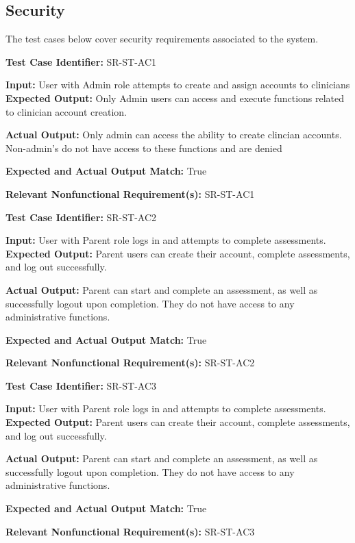 \documentclass[12pt, titlepage]{article}
\begin{document}
\newpage{}

\subsection{Security}
\hspace{2em}The test cases below cover security requirements associated to the system. 

\begin{mdframed}[linewidth=0.5mm] \par
  \textbf{Test Case Identifier:} SR-ST-AC1 \par
  \textbf{Input:} User with Admin role attempts to create and assign accounts
  to clinicians  
  \textbf{Expected Output:} Only Admin users can access and execute functions related to
  clinician account creation. \par
  \textbf{Actual Output:} Only admin can access the ability to create clincian accounts. Non-admin's do not have access to these functions
  and are denied \par
  \textbf{Expected and Actual Output Match:} True \par
  \textbf{Relevant Nonfunctional Requirement(s):} SR-ST-AC1
\end{mdframed}

\begin{mdframed}[linewidth=0.5mm] \par
  \textbf{Test Case Identifier:} SR-ST-AC2 \par
  \textbf{Input:} User with Parent role logs in and attempts to complete
  assessments.
  \textbf{Expected Output:} Parent users can create their account, complete assessments,
  and log out successfully. \par
  \textbf{Actual Output:} Parent can start and complete an assessment, as well as successfully logout upon completion. They do not have access to any administrative functions. \par
  \textbf{Expected and Actual Output Match:} True \par
  \textbf{Relevant Nonfunctional Requirement(s):} SR-ST-AC2
\end{mdframed}

\begin{mdframed}[linewidth=0.5mm] \par
  \textbf{Test Case Identifier:} SR-ST-AC3 \par
  \textbf{Input:} User with Parent role logs in and attempts to complete
  assessments.
  \textbf{Expected Output:} Parent users can create their account, complete assessments,
  and log out successfully. \par
  \textbf{Actual Output:} Parent can start and complete an assessment, as well as successfully logout upon completion. They do not have access to any administrative functions. \par
  \textbf{Expected and Actual Output Match:} True \par
  \textbf{Relevant Nonfunctional Requirement(s):} SR-ST-AC3 
\end{mdframed}
\end{document}
